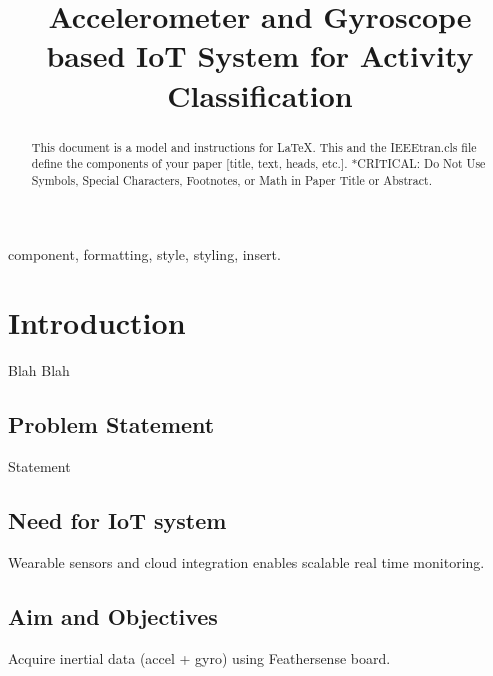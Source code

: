 \documentclass[conference]{lib/IEEEtran}
\begin{document}
\title{Accelerometer and Gyroscope based IoT System for Activity Classification\\
}

\author{
\and
{}
}

\maketitle

\begin{abstract}
This document is a model and instructions for \LaTeX.
This and the IEEEtran.cls file define the components of your paper [title, text, heads, etc.]. *CRITICAL: Do Not Use Symbols, Special Characters, Footnotes, 
or Math in Paper Title or Abstract.
\end{abstract}

\begin{IEEEkeywords}
component, formatting, style, styling, insert.
\end{IEEEkeywords}

\section{Introduction}
Blah Blah

\subsection{Problem Statement}
Statement

\subsection{Need for IoT system}
Wearable sensors and cloud integration enables scalable real time monitoring.


\subsection{Aim and Objectives}\label{AA}
Acquire inertial data (accel + gyro) using Feathersense board.
\end{document}
